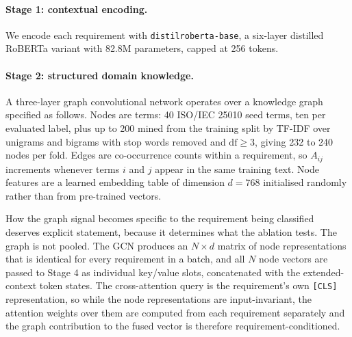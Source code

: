 \documentclass[11pt,a4paper]{article}
\begin{document}
\paragraph{Stage 1: contextual encoding.}
We encode each requirement with \texttt{distilroberta-base}, a six-layer distilled RoBERTa
variant with 82.8M parameters, capped at 256 tokens.

\paragraph{Stage 2: structured domain knowledge.}
A three-layer graph convolutional network operates over a knowledge graph specified as follows.
Nodes are terms: 40 ISO/IEC 25010 seed terms, ten per evaluated label, plus up to 200 mined
from the training split by TF-IDF over unigrams and bigrams with stop words removed and
$\mathrm{df} \geq 3$, giving 232 to 240 nodes per fold. Edges are
co-occurrence counts within a requirement, so $A_{ij}$ increments whenever terms $i$ and $j$
appear in the same training text. Node features are a learned embedding table of dimension $d = 768$ initialised randomly rather than from
pre-trained vectors.

How the graph signal becomes specific to the requirement being classified deserves explicit statement,
because it determines what the ablation tests. The graph is not pooled. The GCN produces an
$N \times d$ matrix of node representations that is identical for every requirement in a batch, and all
$N$ node vectors are passed to Stage 4 as individual key/value slots, concatenated with the
extended-context token states. The cross-attention query is the requirement's own \texttt{[CLS]}
representation, so while the node representations are input-invariant, the attention weights over them are
computed from each requirement separately and the graph contribution to the fused vector is therefore
requirement-conditioned.
\end{document}
